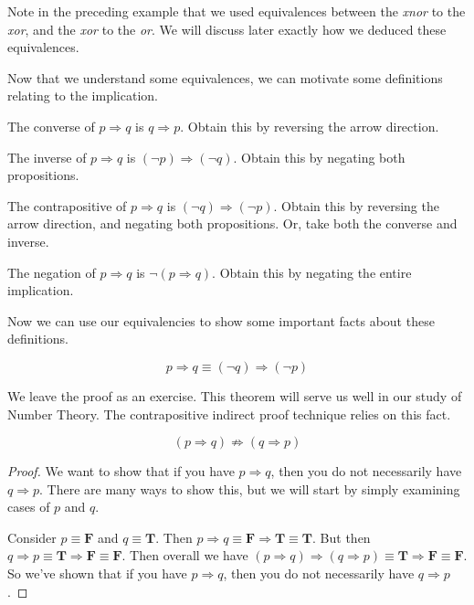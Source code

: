 \documentclass[main.tex]{subfiles}
\begin{document}
Note in the preceding example that we used equivalences between the \textit{xnor} to the \textit{xor}, and the \textit{xor} to the \textit{or}. We will discuss later exactly how we deduced these equivalences.

Now that we understand some equivalences, we can motivate some definitions relating to the implication.

\begin{defn}[Converse]
	The converse of \(p \Rightarrow q\) is \(q \Rightarrow p\). Obtain this by reversing the arrow direction.
\end{defn}

\begin{defn}[Inverse]
	The inverse of \(p \Rightarrow q\) is \((\lnot p) \Rightarrow (\lnot q)\). Obtain this by negating both propositions.
\end{defn}

\begin{defn}[Contrapositive]
	The contrapositive of \(p \Rightarrow q\) is \((\lnot q) \Rightarrow (\lnot p)\). Obtain this by reversing the arrow direction, and negating both propositions. Or, take both the converse and inverse.
\end{defn}

\begin{defn}[Negation]
	The negation of \(p \Rightarrow q\) is \(\lnot (p \Rightarrow q)\). Obtain this by negating the entire implication.
\end{defn}

Now we can use our equivalencies to show some important facts about these definitions.

\begin{thm}
	\[p \Rightarrow q \equiv (\lnot q) \Rightarrow (\lnot p)\]
\end{thm}

We leave the proof as an exercise. This theorem will serve us well in our study of Number Theory. The contrapositive indirect proof technique relies on this fact.

\begin{thm}
	\[(p \Rightarrow q) \not\Rightarrow (q \Rightarrow p)\]
\end{thm}

\begin{proof}
	We want to show that if you have \(p \Rightarrow q\), then you do not necessarily have \(q \Rightarrow p\). There are many ways to show this, but we will start by simply examining cases of \(p\) and \(q\).
	
	Consider \(p \equiv \mathbf{F}\) and \(q \equiv \mathbf{T}\). Then
	\(p \Rightarrow q \equiv \mathbf{F} \Rightarrow \mathbf{T} \equiv \mathbf{T}\). But then
	\(q \Rightarrow p \equiv \mathbf{T} \Rightarrow \mathbf{F} \equiv \mathbf{F}\). Then overall we have
	\((p \Rightarrow q) \Rightarrow (q \Rightarrow p) \equiv \mathbf{T} \Rightarrow \mathbf{F} \equiv \mathbf{F}\).
	So we've shown that if you have \(p \Rightarrow q\), then you do not necessarily have \(q \Rightarrow p\).
\end{proof}
\end{document}
